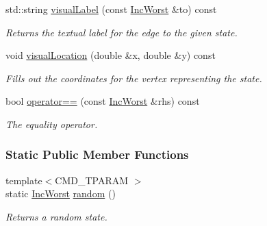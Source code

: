 \begin{DoxyCompactItemize}
std\+::string \hyperlink{structslb_1_1ext_1_1domain_1_1incWorst_1_1IncWorst_af62425a98b05688bd47731862fa57a7e}{visual\+Label} (const \hyperlink{structslb_1_1ext_1_1domain_1_1incWorst_1_1IncWorst}{Inc\+Worst} \&to) const 
\begin{DoxyCompactList}\small\item\em Returns the textual label for the edge to the given state. \end{DoxyCompactList}\item 
void \hyperlink{structslb_1_1ext_1_1domain_1_1incWorst_1_1IncWorst_ad4656b5c5db486f4d8a884c765d02e9f}{visual\+Location} (double \&x, double \&y) const 
\begin{DoxyCompactList}\small\item\em Fills out the coordinates for the vertex representing the state. \end{DoxyCompactList}\item 
bool \hyperlink{structslb_1_1ext_1_1domain_1_1incWorst_1_1IncWorst_abd60ffe4de89a9d6a9d94ae6db2901d2}{operator==} (const \hyperlink{structslb_1_1ext_1_1domain_1_1incWorst_1_1IncWorst}{Inc\+Worst} \&rhs) const 
\begin{DoxyCompactList}\small\item\em The equality operator. \end{DoxyCompactList}\end{DoxyCompactItemize}
\subsubsection*{Static Public Member Functions}
\begin{DoxyCompactItemize}
\item 
{\footnotesize template$<$C\+M\+D\+\_\+\+T\+P\+A\+R\+AM $>$ }\\static \hyperlink{structslb_1_1ext_1_1domain_1_1incWorst_1_1IncWorst}{Inc\+Worst} \hyperlink{structslb_1_1ext_1_1domain_1_1incWorst_1_1IncWorst_a0292e3369f3fa58821169813803a4b7b}{random} ()
\begin{DoxyCompactList}\small\item\em Returns a random state. \end{DoxyCompactList}\end{DoxyCompactItemize}
